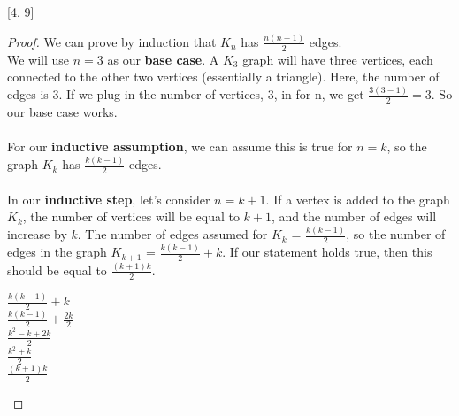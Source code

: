 \documentclass[12pt,letterpaper]{exam}
\begin{document}
[4, 9]
\begin{proof}We can prove by induction that $K_n$ has $\frac{n(n-1)}{2}$ edges.\\
We will use $n=3$ as our \textbf{base case}. A $K_3$ graph will have three vertices, each connected to the other two vertices (essentially a triangle). Here, the number of edges is 3. If we plug in the number of vertices, 3, in for n, we get $\frac{3(3-1)}{2} = 3$. So our base case works.\\\\
For our \textbf{inductive assumption}, we can assume this is true for $n=k$, so the graph $K_k$ has $\frac{k(k-1)}{2}$ edges.\\\\
In our \textbf{inductive step}, let's consider $n=k+1$. If a vertex is added to the graph $K_k$, the number of vertices will be equal to $k+1$, and the number of edges will increase by $k$. The number of edges assumed for $K_k$ = $\frac{k(k-1)}{2}$, so the number of edges in the graph $K_{k+1}$ = $\frac{k(k-1)}{2} +k$. If our statement holds true, then this should be equal to $\frac{(k+1)k}{2}$.
\begin{center}
$\frac{k(k-1)}{2} +k$\\
$\frac{k(k-1)}{2} +\frac{2k}{2}$\\
$\frac{k^2-k+2k}{2}$\\
$\frac{k^2+k}{2}$\\
$\frac{(k+1)k}{2}$
\end{center}

\end{proof}
\end{document}
